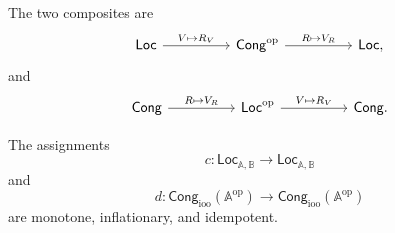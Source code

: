 The two composites are
\[
\begin{tikzcd}[column sep=huge]
    \mathsf{Loc}
        \arrow[r, "{V\mapsto R_V}"]
    &
    \mathsf{Cong}^{\mathrm{op}}
        \arrow[r, "{R\mapsto V_R}"]
    &
    \mathsf{Loc},
\end{tikzcd}
\]
and
\[
\begin{tikzcd}[column sep=huge]
    \mathsf{Cong}
        \arrow[r, "{R\mapsto V_R}"]
    &
    \mathsf{Loc}^{\mathrm{op}}
        \arrow[r, "{V\mapsto R_V}"]
    &
    \mathsf{Cong}.
\end{tikzcd}
\]

\begin{proposition}
\label{prop:to-closure-operators}
    The assignments
    \[
        c:
        \mathsf{Loc}_{\mathbb A,\mathbb B}
        \to
        \mathsf{Loc}_{\mathbb A,\mathbb B}
    \]
    and
    \[
        d:
        \mathsf{Cong}_{\mathrm{ioo}}(\mathbb A^{\mathrm{op}})
        \to
        \mathsf{Cong}_{\mathrm{ioo}}(\mathbb A^{\mathrm{op}})
    \]
    are monotone, inflationary, and idempotent.
\end{proposition}


